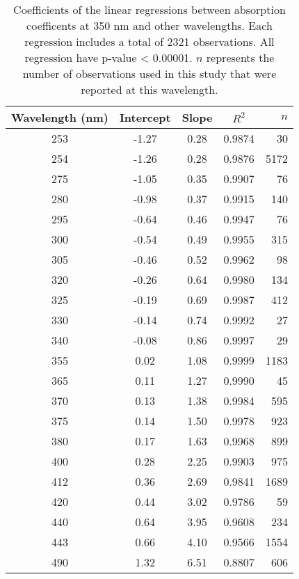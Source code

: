 \begin{table}[ht]
\centering
\begin{tabular}{ccccr}
  \hline
Wavelength (nm) & Intercept & Slope & $R^2$ & $n$ \\ 
  \hline
253 & -1.27 & 0.28 & 0.9874 & 30 \\ 
  254 & -1.26 & 0.28 & 0.9876 & 5172 \\ 
  275 & -1.05 & 0.35 & 0.9907 & 76 \\ 
  280 & -0.98 & 0.37 & 0.9915 & 140 \\ 
  295 & -0.64 & 0.46 & 0.9947 & 76 \\ 
  300 & -0.54 & 0.49 & 0.9955 & 315 \\ 
  305 & -0.46 & 0.52 & 0.9962 & 98 \\ 
  320 & -0.26 & 0.64 & 0.9980 & 134 \\ 
  325 & -0.19 & 0.69 & 0.9987 & 412 \\ 
  330 & -0.14 & 0.74 & 0.9992 & 27 \\ 
  340 & -0.08 & 0.86 & 0.9997 & 29 \\ 
  355 & 0.02 & 1.08 & 0.9999 & 1183 \\ 
  365 & 0.11 & 1.27 & 0.9990 & 45 \\ 
  370 & 0.13 & 1.38 & 0.9984 & 595 \\ 
  375 & 0.14 & 1.50 & 0.9978 & 923 \\ 
  380 & 0.17 & 1.63 & 0.9968 & 899 \\ 
  400 & 0.28 & 2.25 & 0.9903 & 975 \\ 
  412 & 0.36 & 2.69 & 0.9841 & 1689 \\ 
  420 & 0.44 & 3.02 & 0.9786 & 59 \\ 
  440 & 0.64 & 3.95 & 0.9608 & 234 \\ 
  443 & 0.66 & 4.10 & 0.9566 & 1554 \\ 
  490 & 1.32 & 6.51 & 0.8807 & 606 \\ 
   \hline
\end{tabular}
\caption{Coefficients of the linear regressions between absorption 
coefficents at 350 nm and other wavelengths. Each regression includes a total 
of 2321 observations. All regression have p-value < 0.00001.  $n$ represents 
the number of observations used in this study that were reported at this 
wavelength.} 
\end{table}

